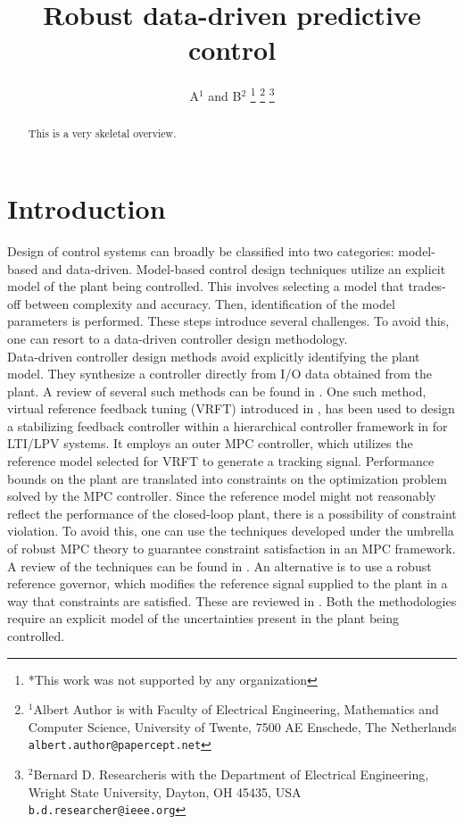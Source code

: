 \documentclass[letterpaper, 10 pt, conference]{ieeeconf}  %
\title{\LARGE \bf
Robust data-driven predictive control
}
\author{A$^{1}$ and B$^{2}$%
\thanks{*This work was not supported by any organization}%
\thanks{$^{1}$Albert Author is with Faculty of Electrical Engineering, Mathematics and Computer Science,
        University of Twente, 7500 AE Enschede, The Netherlands
        {\tt\small albert.author@papercept.net}}%
\thanks{$^{2}$Bernard D. Researcheris with the Department of Electrical Engineering, Wright State University,
        Dayton, OH 45435, USA
        {\tt\small b.d.researcher@ieee.org}}%
}
\begin{document}
\maketitle
\thispagestyle{empty}
\pagestyle{empty}


\begin{abstract}

This is a very skeletal overview.

\end{abstract}


\section{Introduction}
Design of control systems can broadly be classified into two categories: model-based and data-driven. Model-based control design techniques utilize an explicit model of the plant being controlled. This involves selecting a model that trades-off between complexity and accuracy. Then, identification of the model parameters is performed. These steps introduce several challenges. To avoid this, one can resort to a data-driven controller design methodology. \\
\indent
Data-driven controller design methods avoid explicitly identifying the plant model. They synthesize a controller directly from I/O data obtained from the plant. A review of several such methods can be found in \cite{HOU20133}. One such method, virtual reference feedback tuning (VRFT) introduced in \cite{CAMPI20021337}, has been used to design a stabilizing feedback controller within a hierarchical controller framework in \cite{7932940} for LTI/LPV systems. It employs an outer MPC controller, which utilizes the reference model selected for VRFT to generate a tracking signal. Performance bounds on the plant are translated into constraints on the optimization problem solved by the MPC controller. Since the reference model might not reasonably reflect the performance of the closed-loop plant, there is a possibility of constraint violation.
To avoid this, one can use the techniques developed under the umbrella of robust MPC theory to guarantee constraint satisfaction in an MPC framework. A review of the techniques can be found in \cite{10.1007/BFb0109870}. An alternative is to use a robust reference governor, which modifies the reference signal supplied to the plant in a way that constraints are satisfied. These are reviewed in \cite{GARONE2017306}. Both the methodologies require an explicit model of the uncertainties present in the plant being controlled. 
\end{document}
